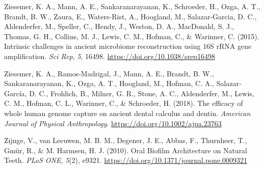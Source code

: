 \documentclass[
]{article}
\newlength{\cslhangindent}
\newlength{\cslentryspacingunit} %
\newenvironment{CSLReferences}[2] %
 {%
  \setlength{\parindent}{0pt}
  \ifodd #1
  \let\oldpar\par
  \def\par{\hangindent=\cslhangindent\oldpar}
  \fi
  \setlength{\parskip}{#2\cslentryspacingunit}
 }%
 {}
\begin{document}
\begin{CSLReferences}{1}{0}
\leavevmode{}%
Ziesemer, K. A., Mann, A. E., Sankaranarayanan, K., Schroeder, H., Ozga,
A. T., Brandt, B. W., Zaura, E., Waters-Rist, A., Hoogland, M.,
Salazar-Garcia, D. C., Aldenderfer, M., Speller, C., Hendy, J., Weston,
D. A., MacDonald, S. J., Thomas, G. H., Collins, M. J., Lewis, C. M.,
Hofman, C., \& Warinner, C. (2015). Intrinsic challenges in ancient
microbiome reconstruction using {16S rRNA} gene amplification. \emph{Sci
Rep}, \emph{5}, 16498. \url{https://doi.org/10.1038/srep16498}

\leavevmode{}%
Ziesemer, K. A., Ramos‐Madrigal, J., Mann, A. E., Brandt, B. W.,
Sankaranarayanan, K., Ozga, A. T., Hoogland, M., Hofman, C. A.,
Salazar‐García, D. C., Frohlich, B., Milner, G. R., Stone, A. C.,
Aldenderfer, M., Lewis, C. M., Hofman, C. L., Warinner, C., \&
Schroeder, H. (2018). The efficacy of whole human genome capture on
ancient dental calculus and dentin. \emph{American Journal of Physical
Anthropology}. \url{https://doi.org/10.1002/ajpa.23763}

\leavevmode{}%
Zijnge, V., van Leeuwen, M. B. M., Degener, J. E., Abbas, F., Thurnheer,
T., Gmür, R., \& M. Harmsen, H. J. (2010). Oral {Biofilm Architecture}
on {Natural Teeth}. \emph{PLoS ONE}, \emph{5}(2), e9321.
\url{https://doi.org/10.1371/journal.pone.0009321}

\end{CSLReferences}
\end{document}
